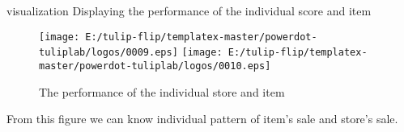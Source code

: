 \documentclass[
 size=12pt,
 paper=smartboard, %
 mode=present, %
 display=slides, %
style=tuliplab,
pauseslide,
fleqn,leqno]{powerdot}
\begin{document}
  \begin{slide}[toc=,bm=]{visualization}
    Displaying the performance of the individual score and item
    \vspace{1cm} 
    \begin{figure}[ht]%
      \centering%
      \texttt{[image: E:/tulip-flip/templatex-master/powerdot-tuliplab/logos/0009.eps]}
      \texttt{[image: E:/tulip-flip/templatex-master/powerdot-tuliplab/logos/0010.eps]}
      \caption{The performance of the individual store and item}%
      \end{figure}
      \vspace{0.5cm}
      From this figure we can know individual pattern of item's sale and store's sale.
    \end{slide}


\end{document}
